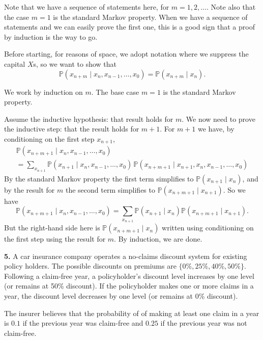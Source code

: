 \documentclass[
  a4paper,
]{article}
\theoremstyle{definition}
\theoremstyle{definition}
\theoremstyle{definition}
\theoremstyle{remark}
\begin{document}
\begin{myanswers}

Note that we have a sequence of statements here, for \(m = 1, 2, \dots\). Note also that the case \(m = 1\) is the standard Markov property. When we have a sequence of statements and we can easily prove the first one, this is a good sign that a proof by induction is the way to go.

Before starting, for reasons of space, we adopt notation where we suppress the capital \(X\)s, so we want to show that
\[ \mathbb P(x_{n+m} \mid x_n, x_{n-1}, \dots, x_0 ) = \mathbb P(x_{n+m} \mid x_n) . \]

We work by induction on \(m\). The base case \(m = 1\) is the standard Markov property.

Assume the inductive hypothesis: that result holds for \(m\). We now need to prove the inductive step: that the result holds for \(m+1\). For \(m+1\) we have, by conditioning on the first step \(x_{n+1}\),
\begin{multline*} \mathbb P(x_{n+m+1} \mid x_n, x_{n-1}, \dots, x_0 ) \\
 = \sum_{x_{n+1}} \mathbb P(x_{n+1} \mid x_n, x_{n-1}, \dots, x_0 )\,\mathbb P(x_{n+m+1} \mid x_{n+1}, x_n, x_{n-1}, \dots, x_0 )     \end{multline*}
By the standard Markov property the first term simplifies to \(\mathbb P(x_{n+1} \mid x_n)\), and by the result for \(m\) the second term simplifies to \(\mathbb P(x_{n+m+1} \mid x_{n+1})\). So we have
\[ \mathbb P(x_{n+m+1} \mid x_n, x_{n-1}, \dots, x_0 ) = \sum_{x_{n+1}} \mathbb P(x_{n+1} \mid x_n) \mathbb P(x_{n+m+1} \mid x_{n+1}) . \]
But the right-hand side here is \(\mathbb P(x_{n+m+1} \mid x_n)\) written using conditioning on the first step using the result for \(m\). By induction, we are done.

\end{myanswers}

\textbf{5.} A car insurance company operates a no-claims discount system for existing policy holders. The possible discounts on premiums are \(\{0\%,25\%,40\%,50\%\}\). Following a claim-free year, a policyholder's discount level increases by one level (or remains at 50\% discount). If the policyholder makes one or more claims in a year, the discount level decreases by one level (or remains at 0\% discount).

The insurer believes that the probability of of making at least one claim in a year is \(0.1\) if the previous year was claim-free and \(0.25\) if the previous year was not claim-free.
\end{document}
